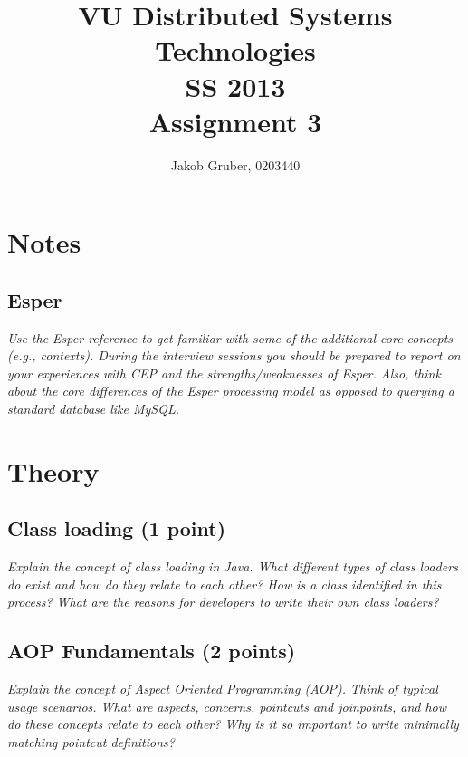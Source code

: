 \documentclass[a4paper,10pt]{article}
\title{VU Distributed Systems Technologies \\
       SS 2013 \\
       Assignment 3}
\author{Jakob Gruber, 0203440}
\begin{document}
\maketitle

\section{Notes}

\subsection{Esper}

\emph{Use the Esper
reference to get familiar with some of the additional core concepts (e.g., contexts). During the interview
sessions you should be prepared to report on your experiences with CEP and the strengths/weaknesses
of Esper. Also, think about the core differences of the Esper processing model as opposed to querying a
standard database like MySQL.}

\vspace{3mm}

\section{Theory}

\subsection{Class loading (1 point)}

\emph{Explain the concept of class loading in Java. What different types of class loaders do exist and how do
they relate to each other? How is a class identified in this process? What are the reasons for developers
to write their own class loaders?}

\vspace{3mm}

\subsection{AOP Fundamentals (2 points)}

\emph{Explain the concept of Aspect Oriented Programming (AOP). Think of typical usage scenarios. What
are aspects, concerns, pointcuts and joinpoints, and how do these concepts relate to each other?
Why is it so important to write minimally matching pointcut definitions?}

\vspace{3mm}
\end{document}
